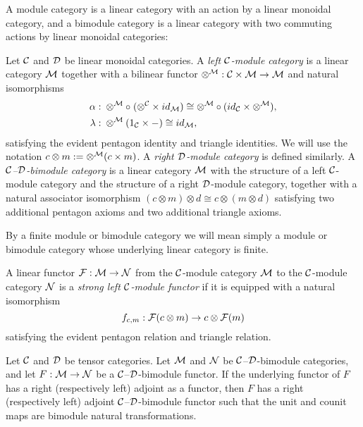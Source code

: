 \documentclass{amsart}
\begin{document}
A module category is a linear category with an action by a linear monoidal category, and a bimodule category is a linear category with two commuting actions by linear monoidal categories:
\begin{definition}
Let $\mathcal C$ and $\mathcal D$ be linear monoidal categories.
A \emph{left $\mathcal C$-module category} is a linear category $\mathcal M$ together with a bilinear functor $\otimes^{\mathcal M}: \mathcal C \times \mathcal M \to \mathcal M$ and natural isomorphisms
\begin{align*}
		\alpha: & \;    \otimes^{\mathcal M} \circ \; (\otimes^{\mathcal C} \times id_{\mathcal M}) \cong  \otimes^{\mathcal M} \circ (id_{\mathcal C} \times \otimes^{\mathcal M}), \\
		\lambda: & \; \otimes^{\mathcal M} (1_{\mathcal C} \times -) \cong id_{\mathcal M},
\end{align*}
satisfying the evident pentagon identity and triangle identities.  We will use the notation $c \otimes m := \otimes^\mathcal M(c \times m)$.  A \emph{right $\mathcal D$-module category} is defined similarly.  A \emph{$\mathcal C$--$\mathcal D$-bimodule category} is a linear category $\mathcal M$ with the structure of a left $\mathcal C$-module category and the structure of a right $\mathcal D$-module category, together with a natural associator isomorphism $(c \otimes m) \otimes d \cong c \otimes (m \otimes d)$ satisfying two additional pentagon axioms and two additional triangle axioms.  
\end{definition}
\nid By a finite module or bimodule category we will mean simply a module or bimodule category whose underlying linear category is finite. 

\begin{definition}
A linear functor $\mathcal F: \mathcal M \rightarrow \mathcal N$ from the $\mathcal C$-module category $\mathcal M$ to the $\mathcal C$-module category $\mathcal N$ is a \emph{strong left $\mathcal C$-module functor} if it is equipped with a natural isomorphism 
	\begin{equation*}
		f_{c,m}:\mathcal F(c \otimes m) \rightarrow c \otimes \mathcal F(m)
	\end{equation*}
	satisfying the evident pentagon relation and triangle relation.
\end{definition}

\begin{lemma} \label{lma:module-adjoint} \cite[\S 3.3]{EO-ftc}
Let $\mathcal C$ and $\mathcal D$ be tensor categories. Let  $\mathcal M$ and  $\mathcal N$  be  $\mathcal C$--$\mathcal D$-bimodule categories, and let $F: \mathcal M \to \mathcal N$ be a $\mathcal C$--$\mathcal D$-bimodule functor.  If the underlying functor of $F$ has a right (respectively left) adjoint as a functor, then $F$ has a right (respectively left) adjoint $\mathcal C$--$\mathcal D$-bimodule functor such that the unit and counit maps are bimodule natural transformations.
\end{lemma}
\end{document}
